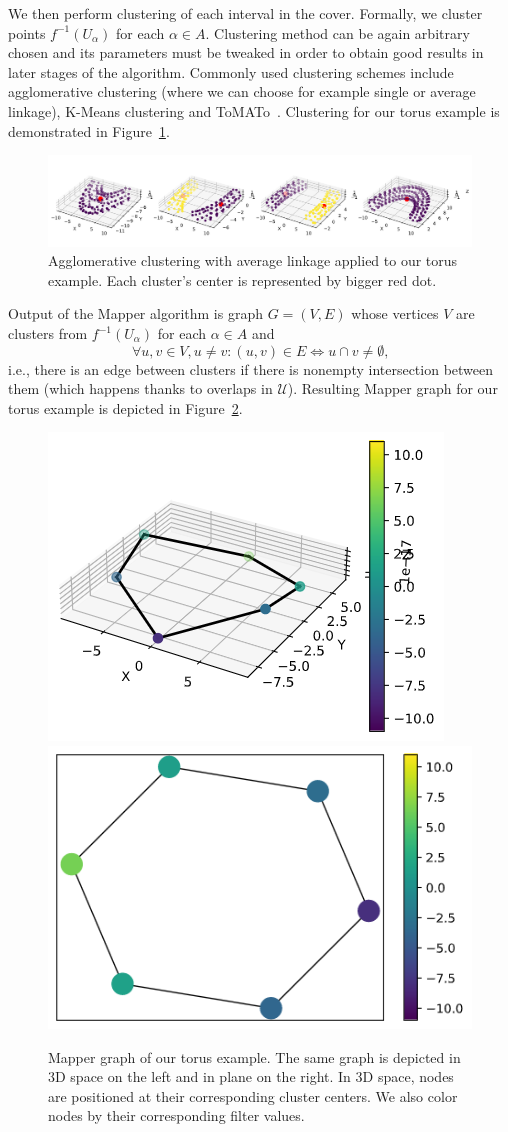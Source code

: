 \documentclass{article}
\begin{document}
We then perform clustering of each interval in the cover. Formally, we cluster
points $f^{-1}(U_\alpha)$ for each $\alpha \in A$. Clustering method can be
again arbitrary chosen and its parameters must be tweaked in order to obtain
good results in later stages of the algorithm. Commonly used clustering schemes
include agglomerative clustering (where we can choose for example single or
average linkage), K\nobreakdash-Means clustering and ToMATo~\cite{tomato}. Clustering for our
torus example is demonstrated in Figure~\ref{fig:torus-cluster}.

\begin{figure}[ht]
    \centering
    \includegraphics[width=0.9\columnwidth]{torus-clustering}
    \caption{Agglomerative clustering with average linkage applied to our torus example.
        Each cluster's center is represented by bigger red dot.}
    \label{fig:torus-cluster}
\end{figure}

Output of the Mapper algorithm is graph $G=(V,E)$ whose vertices $V$ are
clusters from $f^{-1}(U_\alpha)$ for each $\alpha \in A$ and
$$
    \forall u, v \in V, u \neq v: (u, v) \in E \Leftrightarrow u \cap v \neq \emptyset \mbox{,}
$$
i.e., there is an edge between clusters if there is nonempty intersection between them (which happens thanks to overlaps in $\mathcal{U}$).
Resulting Mapper graph for our torus example is depicted in Figure~\ref{fig:torus-mapper}.

\begin{figure}[ht]
    \centering
    \includegraphics[align=c, width=0.4\columnwidth]{torus-graph-3d}
    \includegraphics[align=c, width=0.4\columnwidth]{torus-graph-2d}
    \caption{Mapper graph of our torus example.
        The same graph is depicted in 3D space on the left and in plane on the right.
        In 3D space, nodes are positioned at their corresponding cluster centers.
        We also color nodes by their corresponding filter values.}
    \label{fig:torus-mapper}
\end{figure}
\end{document}
